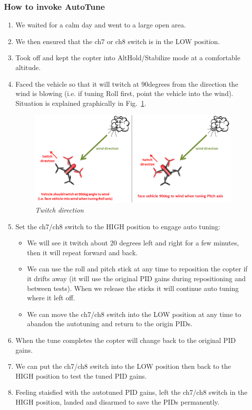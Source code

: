 \subsubsection{How to invoke AutoTune}
\begin{enumerate}
	\item We waited for a calm day and went to a large open area.
	\item We then ensured that the ch7 or ch8 switch is in the LOW position.
	\item Took off and kept the copter into AltHold/Stabilize mode at a comfortable altitude.
	\item Faced the vehicle so that it will twitch at 90degrees from the direction the wind is blowing (i.e. if tuning Roll first, point the vehicle into the wind). Situation is explained graphically in Fig.~\ref{fig: autotune_copterwind}.
\begin{figure}[h]
	\includegraphics[width=1.0\linewidth]{autotune_copterwind}
	\centering
	\caption{\label{fig: autotune_copterwind}\textit{Twitch direction}}
\end{figure}
	\item Set the ch7/ch8 switch to the HIGH position to engage auto tuning:
	\begin{itemize}
		\item We will see it twitch about 20 degrees left and right for a few minutes, then it will repeat forward and back.
		\item We can use the roll and pitch stick at any time to reposition the copter if it drifts away (it will use the original PID gains during repositioning and between tests). When we release the sticks it will continue auto tuning where it left off.
		\item We can move the ch7/ch8 switch into the LOW position at any time to abandon the autotuning and return to the origin PIDs.
	\end{itemize}
	\item When the tune completes the copter will change back to the original PID gains.
	\item We can put the ch7/ch8 switch into the LOW position then back to the HIGH position to test the tuned PID gains.
	\item Feeling staisfied with the autotuned PID gains, left the ch7/ch8 switch in the HIGH position, landed and disarmed to save the PIDs permanently.
\end{enumerate}
